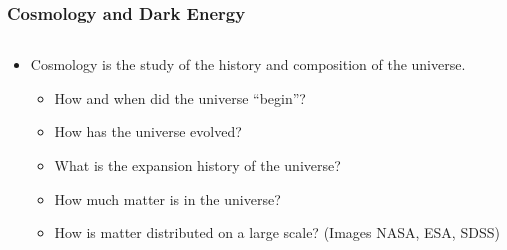 \documentclass{beamer}
\begin{document}
\frame
{
    \frametitle{Cosmology and Dark Energy}


    \begin{columns}
        \begin{column}{0.5\textwidth}    
            \begin{itemize}

                \item Cosmology is the study of the history and composition of the universe.

                \begin{itemize}
                        
                    \item How and when did the universe ``begin''?

                    \item How has the universe evolved?

                    \item What is the expansion history of the universe?

                    \item How much matter is in the universe?

                    \item How is matter distributed on a large scale?
                        {\tiny (Images NASA, ESA, SDSS)}

                \end{itemize}


\end{itemize}
\end{column}
\end{columns}}
\end{document}
